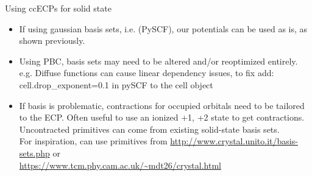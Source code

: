 \begin{frame}
    {Using ccECPs for solid state}
    \begin{itemize}
        \item If using gaussian basis sets, i.e. (PySCF), our potentials can be used as is, as shown previously.
        \item Using PBC, basis sets may need to be altered and/or reoptimized entirely. e.g. Diffuse functions can cause linear dependency issues, to fix add: \\
            {\color{darkblue}cell.drop\_exponent=0.1} in pySCF to the cell object
        \item If basis is problematic, contractions for occupied orbitals need to be tailored to the ECP. Often useful to use an ionized +1, +2 state to get contractions.\\
            Uncontracted primitives can come from existing solid-state basis sets. \\
            For inspiration, can use primitives from \url{http://www.crystal.unito.it/basis-sets.php} or \\
            \url{https://www.tcm.phy.cam.ac.uk/~mdt26/crystal.html}
    \end{itemize}
\end{frame}

